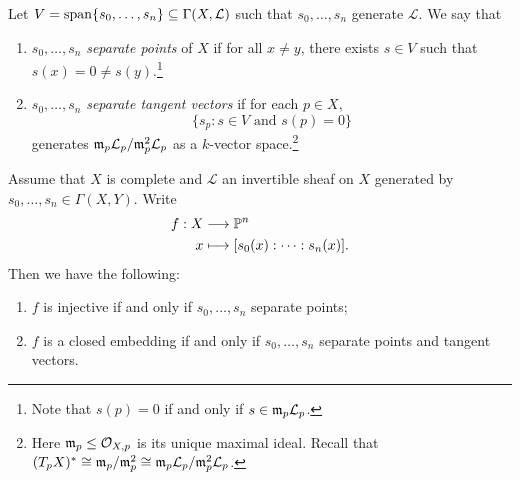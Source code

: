 \begin{definition}
  Let $V = \operatorname{span}\{s_0, \dots, s_n\} \subseteq \Gamma(X, \mathcal{L})$
  such that $s_0, \dots, s_n$ generate
  $\mathcal{L}$. We say that
  \begin{enumerate}
    \item $s_0, \dots, s_n$
      \emph{separate points} of $X$ if
      for all $x \ne y$, there exists
      $s \in V$ such that $s(x) = 0 \ne s(y)$.\footnote{Note that $s(p) = 0$ if and only if $s \in \mathfrak{m}_p \mathcal{L}_p$.}
    \item $s_0, \dots, s_n$
      \emph{separate tangent vectors}
      if for each $p \in X$,
      \[
        \{s_p : s \in V \text{ and } s(p) = 0\}
      \]
      generates $\mathfrak{m}_p \mathcal{L}_p / \mathfrak{m}_p^2 \mathcal{L}_p$ as a $k$-vector space.\footnote{Here $\mathfrak{m}_p \le \mathcal{O}_{X, p}$ is its unique maximal ideal. Recall that $(T_p X)^* \cong \mathfrak{m}_p / \mathfrak{m}_p^2 \cong \mathfrak{m}_p \mathcal{L}_p / \mathfrak{m}_p^2 \mathcal{L}_p$.}
  \end{enumerate}
\end{definition}

\begin{prop}
  Assume that $X$ is complete and
  $\mathcal{L}$ an invertible sheaf on
  $X$ generated by $s_0, \dots, s_n \in \Gamma(X, Y)$.
  Write
  \begin{align*}
    f : X &\longrightarrow \mathbb{P}^n \\
    x &\longmapsto [s_0(x) : \cdots : s_n(x)].
  \end{align*}
  Then we have the following:
  \begin{enumerate}
    \item $f$ is injective if and only if
      $s_0, \dots, s_n$ separate points;
    \item $f$ is a closed embedding
      if and only if
      $s_0, \dots, s_n$ separate points and
      tangent vectors.
  \end{enumerate}
\end{prop}


